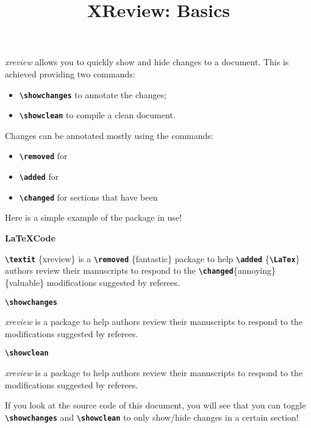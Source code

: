 \documentclass[10pt]{article}
\title{XReview: Basics}
\date{}
\newcommand{\writecommand}[1]{\texttt{\textbf{{\textbackslash#1}}}}
\newcommand{\writearg}[1]{\{#1\}}
\begin{document}
\maketitle

\textit{xreview} allows you to quickly show and hide changes to a document.
This is achieved providing two commands:
\begin{itemize}
    \item \writecommand{showchanges} to annotate the changes;
    \item \writecommand{showclean} to compile a clean document.
\end{itemize}

Changes can be annotated mostly using the commands:
\begin{itemize}
    \item \writecommand{removed} for 
    \item \writecommand{added} for 
    \item \writecommand{changed} for sections that have been 
\end{itemize}

Here is a simple example of the package in use!

\begin{center}
\begin{minipage}[t]{0.3\linewidth}
\textbf{\LaTeX Code}

\writecommand{textit} \writearg{xreview} is a \writecommand{removed} \writearg{fantastic} package to help \writecommand{added} \writearg{\writecommand{LaTex}} authors review their manuscripts to respond to the \writecommand{changed}\writearg{annoying} \writearg{valuable} modifications suggested by referees.

\end{minipage}
\hfill
\begin{minipage}[t]{0.3\linewidth}
\writecommand{showchanges}
\showchanges

\textit{xreview} is a  package to help \added{\LaTeX} authors review their manuscripts to respond to the  modifications suggested by referees.

\end{minipage}
\hfill
\begin{minipage}[t]{0.3\linewidth}   
\writecommand{showclean}
\showclean

\textit{xreview} is a  package to help \added{\LaTeX} authors review their manuscripts to respond to the  modifications suggested by referees.
\end{minipage}
\end{center}

\showchanges

If you look at the source code of this document, you will see that you can toggle \writecommand{showchanges} and \writecommand{showclean} to only show/hide changes in a certain section!
\end{document}
